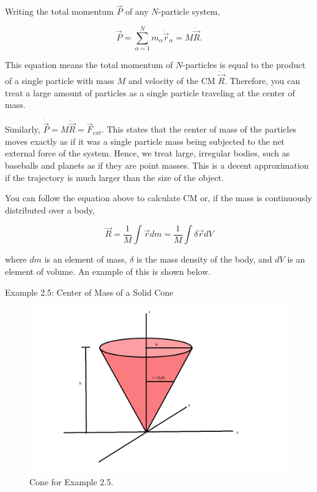 Writing the total momentum $\vec{P}$ of any $N$-particle system,

\begin{equation*}
    \vec{P} = \sum^{N}_{\alpha = 1} m_\alpha \dot{\vec{r}}_\alpha = M \dot{\vec{R}}.
\end{equation*}

This equation means the total momentum of $N$-particles is equal to the product of a single particle with mass $M$ and velocity of the CM $\dot{\vec{R}}$. Therefore, you can treat a large amount of particles as a single particle traveling at the center of mass.

Similarly, $\dot{\vec{P}} = M \ddot{\vec{R}} = \vec{F}_{ext}$. This states that the center of mass of the particles moves exactly as if it was a single particle mass being subjected to the net external force of the system. Hence, we treat large, irregular bodies, such as baseballs and planets as if they are point masses. This is a decent approximation if the trajectory is much larger than the size of the object.

You can follow the equation above to calculate CM or, if the mass is continuously distributed over a body,

\begin{equation*}
    \vec{R} = \frac{1}{M} \int \vec{r} dm = \frac{1}{M} \int \delta \vec{r} dV
\end{equation*}

\noindent where $dm$ is an element of mass, $\delta$ is the mass density of the body, and $dV$ is an element of volume. An example of this is shown below.

{\exbegin Example 2.5: Center of Mass of a Solid Cone}

\begin{figure}[h]
    \centering
    \includegraphics[width=13cm]{Classical_Mechanics/2.5-center-of-mass/ex-cm-cone.png}
    \caption{Cone for Example 2.5.}
    \label{fig:ex-cm-cone}
\end{figure}


